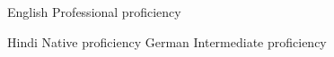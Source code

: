 
\begin{cvskills}

  \cvskill
    {English} %
    {Professional proficiency} %

  \cvskill
    {Hindi} %
    {Native proficiency} %
  \cvskill
    {German} %
    {Intermediate proficiency} %
\end{cvskills}

